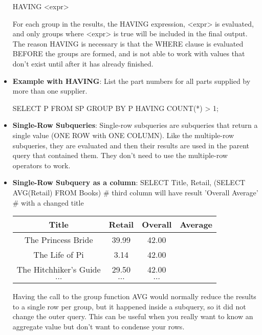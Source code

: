 \documentclass{report}
\begin{document}
\begin{itemize}
\begin{sqlcode}
            HAVING <expr>
            \end{sqlcode}
            \bigbreak \noindent 
            For each group in the results, the HAVING expression, <expr> is evaluated, and only groups where <expr> is true will be included in the final output.
            \bigbreak \noindent 
            The reason HAVING is necessary is that the WHERE clause is evaluated BEFORE the groups are formed, and is not able to work with values that don’t exist until after it has already finished.
        \item \textbf{Example with HAVING}: List the part numbers for all parts supplied by more than one supplier.
            \bigbreak \noindent 
            \begin{sqlcode}
                SELECT P
                    FROM SP
                    GROUP BY P
                    HAVING COUNT(*) > 1;
            \end{sqlcode}
        \item \textbf{Single-Row Subqueries}: Single-row subqueries are subqueries that return a single value (ONE ROW with ONE COLUMN).
            \bigbreak \noindent 
            Like the multiple-row subqueries, they are evaluated and then their results are used in the parent query that contained them.
            \bigbreak \noindent 
            They don’t need to use the multiple-row operators to work.
            \bigbreak \noindent 
        \item \textbf{Single-Row Subquery as a column}: SELECT Title, Retail, (SELECT AVG(Retail) FROM Books) \# third column will have result 'Overall Average' \# with a changed title
            \bigbreak \noindent 
            \begin{center}
                \begin{tabular}{c|c|c}
                    Title &Retail &Overall &Average \\
                    \hline
                    The Princess Bride &39.99 &42.00  \\
                    The Life of Pi &3.14 &42.00 \\
                    The Hitchhiker’s Guide &29.50 &42.00 \\
                    $\cdots$ & $\cdots$ & $\cdots $
                \end{tabular}
            \end{center}
            \bigbreak \noindent 
            Having the call to the group function AVG would normally reduce the results to a single row per group, but it happened inside a subquery, so it did not change the outer query. This can be useful when you really want to know an aggregate value but don’t want to condense your rows.

\end{itemize}
\end{document}
